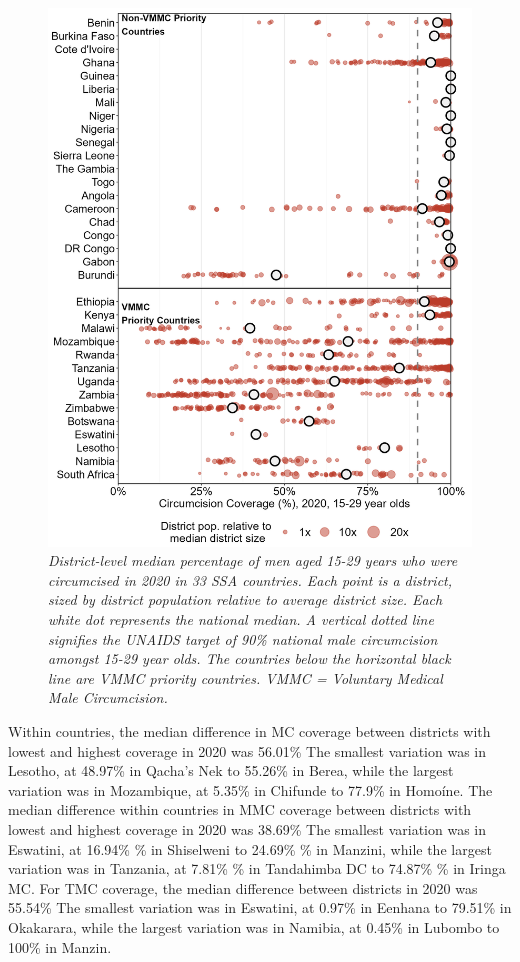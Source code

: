 \documentclass{article}
\begin{document}
\begin{figure}[H]
    \centering
    \includegraphics[width=.9\linewidth]
    {plots/03_subnat_plot.png}
    \caption{\emph{District-level median percentage of men aged 15-29 years who were circumcised in 2020 in 33 SSA countries.
    Each point is a district, sized by district population relative to average district size.
    Each white dot represents the national median. 
    A vertical dotted line signifies the UNAIDS target of 90\% national male circumcision amongst 15-29 year olds. The countries below the horizontal black line are VMMC priority countries. VMMC = Voluntary Medical Male Circumcision.}}
\end{figure}

Within countries, the median difference in MC coverage between districts with lowest and highest coverage in 2020 was 56.01\% The smallest variation was in Lesotho, at 48.97\% in Qacha’s Nek to 55.26\% in Berea, while the largest variation was in Mozambique, at 5.35\% in Chifunde to 77.9\% in Homoíne. 
The median difference within countries in MMC coverage between districts with lowest and highest coverage in 2020 was 38.69\% The smallest variation was in Eswatini, at 16.94\% \% in Shiselweni to 24.69\% \% in Manzini, while the largest variation was in Tanzania, at 7.81\% \% in Tandahimba DC to 74.87\% \% in Iringa MC. 
For TMC coverage, the median difference between districts in 2020 was 55.54\% The smallest variation was in Eswatini, at 0.97\% in Eenhana to 79.51\% in Okakarara, while the largest variation was in Namibia, at 0.45\% in Lubombo to 100\% in Manzin. 
\end{document}
